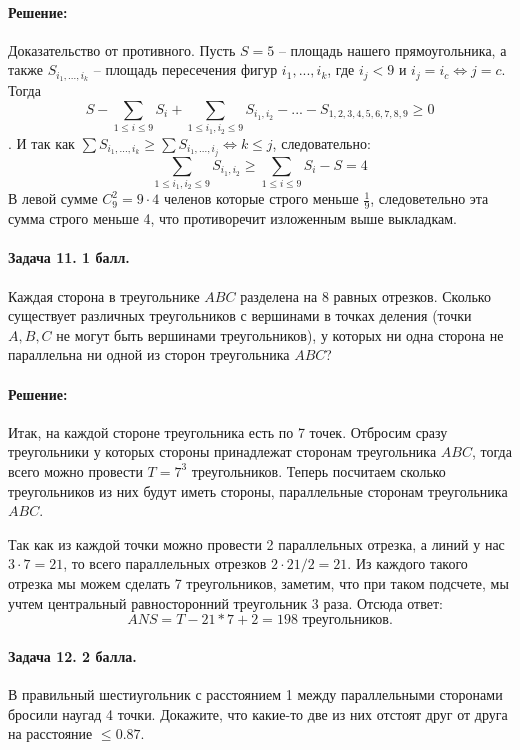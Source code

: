 \documentclass[12pt]{article}
\begin{document}
\paragraph{\bf Решение:}
Доказательство от противного. Пусть $ S = 5 $ -- площадь нашего прямоугольника, а также $ S_{i_1, ..., i_k} $ -- площадь пересечения
фигур $ i_1, ..., i_k $, где $ i_j < 9 \text{ и } i_j = i_c \Leftrightarrow j = c $. Тогда
$$ S - \sum\limits_{1 \le i \le 9} S_i + \sum\limits_{1 \le i_1, i_2 \le 9} S_{i_1, i_2} - ... - S_{1,2,3,4,5,6,7,8,9} \ge 0 $$.
И так как $\sum S_{i_1, ..., i_k} \ge \sum S_{i_1, ..., i_j} \Leftrightarrow k \le j$, следовательно:
$$
\sum\limits_{1 \le i_1, i_2 \le 9} S_{i_1, i_2} \ge \sum\limits_{1 \le i \le 9} S_i - S = 4
$$
В левой сумме $ C_9^2 = 9\cdot4 $ челенов которые строго меньше $ \frac{1}{9} $, 
следоветельно эта сумма строго меньше 4, что противоречит изложенным выше выкладкам.

\paragraph{Задача 11. 1 балл.} Каждая сторона в треугольнике $ ABC $ разделена на 8
равных отрезков. Сколько существует различных треугольников с вершинами в 
точках деления (точки $ A,B,C $ не могут быть вершинами треугольников), у 
которых ни одна сторона не параллельна ни одной из сторон треугольника $ ABC $?

\paragraph{\bf Решение:}
Итак, на каждой стороне треугольника есть по 7 точек. Отбросим сразу треугольники у которых
стороны принадлежат сторонам треугольника $ ABC $, тогда всего можно провести $ T = 7^3 $ треугольников.
Теперь посчитаем сколько треугольников из них будут иметь стороны, параллельные сторонам треугольника $ ABC $.

Так как из каждой точки можно провести 2 параллельных отрезка, а линий у нас $ 3\cdot7 = 21 $, то всего параллельных
отрезков $ 2\cdot 21 / 2 = 21 $. Из каждого такого отрезка мы можем сделать 7 треугольников, 
заметим, что при таком подсчете, мы учтем центральный равносторонний треугольник 3 раза. Отсюда ответ:
$$
ANS = T - 21 * 7 + 2 = 198 \text{ треугольников.}
$$

\paragraph{Задача 12. 2 балла.} В правильный шестиугольник с расстоянием 1 между 
параллельными сторонами бросили наугад 4 точки. Докажите, что какие-то две 
из них отстоят друг от друга на расстояние $ \le 0.87 $. 
\end{document}
